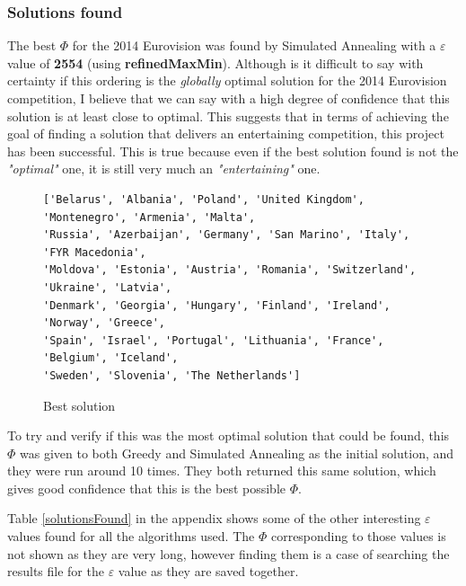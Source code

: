 \documentclass[12pt]{report}
\begin{document}
\subsubsection{Solutions found}
The best $\Phi$ for the 2014 Eurovision was found by Simulated Annealing with a $\varepsilon$ value of \textbf{2554} (using \textbf{refinedMaxMin}). Although is it difficult to say with certainty if this ordering is the \textit{globally} optimal solution for the 2014 Eurovision competition, I believe that we can say with a high degree of confidence that this solution is at least close to optimal. This suggests that in terms of achieving the goal of finding a solution that delivers an entertaining competition, this project has been successful. This is true because even if the best solution found is not the \textit{"optimal"} one, it is still very much an \textit{"entertaining"} one.

\begin{figure}[H]
\caption{Best solution}
\label{bestSolution}
\begin{verbatim}
['Belarus', 'Albania', 'Poland', 'United Kingdom', 'Montenegro', 'Armenia', 'Malta', 
'Russia', 'Azerbaijan', 'Germany', 'San Marino', 'Italy', 'FYR Macedonia', 
'Moldova', 'Estonia', 'Austria', 'Romania', 'Switzerland', 'Ukraine', 'Latvia', 
'Denmark', 'Georgia', 'Hungary', 'Finland', 'Ireland', 'Norway', 'Greece', 
'Spain', 'Israel', 'Portugal', 'Lithuania', 'France', 'Belgium', 'Iceland', 
'Sweden', 'Slovenia', 'The Netherlands']
\end{verbatim}
\end{figure}

To try and verify if this was the most optimal solution that could be found, this $\Phi$ was given to both Greedy and Simulated Annealing as the initial solution, and they were run around 10 times. They both returned this same solution, which gives good confidence that this is the best possible $\Phi$.

Table \ref{solutionsFound} in the appendix shows some of the other interesting $\varepsilon$ values found for all the algorithms used. The $\Phi$ corresponding to those values is not shown as they are very long, however finding them is a case of searching the results file for the $\varepsilon$ value as they are saved together.
\end{document}
